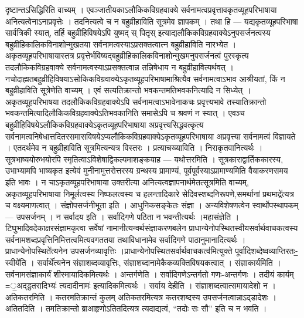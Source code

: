 दृष्टान्तऽसिद्धिरिति वाच्यम् । एवञ्जातीयकाऽलौकिकविग्रहवाक्ये
सर्वनामत्वप्रवृत्तावकृतव्यूहपरिभाषाया अनित्यत्वेनाऽनाप्रवृत्तेः ।
तदनित्यत्वे च न बहुव्रीहाविति सूत्रमेव ज्ञापकम् । तथा हि ---
यद्यकृतव्यूहपरिभाषा सार्वत्रिकी स्यात्, तर्हि बहुव्रीहिविषयेऽपि युष्मद्
स् पितृस् इत्याद्यलौकिकविग्रहवाक्येऽनुपसर्जनत्वस्य
बहुव्रीहिकालिकविनाशोन्मुखतया सर्वनामत्वस्याऽप्रसक्तत्वात्न
बहुव्रीहा॑विति नारभ्येत । अकृतव्यूहपरिभाषायास्तत्र
प्रवृत्तेर्भविष्यद्बहुव्रीहिकालिकविनाशोन्मुखमनुपसर्जनत्वं पुरस्कृत्य
तदलौकिकविग्रहवाक्ये सर्वनामत्वस्याऽप्रसक्तत्वान्न तन्निषेधाय न
बहुव्रीहावित्यर्थवत् ।
नचोदाह्मतबहुव्रीहिविषयाऽसोकिकविग्रवाक्येऽकृतव्यूहपरिभाषामाश्रित्यैव
सर्वनामत्वाऽभाव आश्रीयतां, किं न बहुव्रीहाविति सूत्रेणेति वाच्यम् । एवं
सत्यतिक्रान्तो भवकन्तमतिभवकनित्यादि न सिध्येत् । अकृतव्यूहपरिभाषया
तदलौकिकविग्रहवाक्येऽपि सर्वनामत्वाऽभावेनाकचः प्रवृत्त्यभावे
तस्यातिक्रान्तो भवकन्तमित्यादिलौकिकविग्रहवाक्येऽतिभवकानिति समासेऽपि च
श्रवणं न स्यात् । एवञ्च
बहुव्रीहिविषयेऽलौकिकविग्रहवाक्येऽकृतव्यूहपरिभाषाया
अप्रवृत्त्यसिद्धवत्कृत्य
सर्वनामत्वनिषेधात्तदितरसमासविषयेऽप्यलौकिकविग्रहवाक्येऽकृतव्यूहपरिभाषाया
अप्रवृत्त्या सर्वनामत्वं विज्ञायते । एतदर्थमेव न बहुव्रीहाविति
सूत्रमित्यन्यत्र विस्तरः । प्रत्याचख्याविति । निराकृतवानित्यर्थः ।
सूत्रभाष्ययोरुभयोरपि स्मृतित्वाऽविशेषाद्विकल्पमाशङ्कयाह --- यथोत्तरमिति
। सूत्रकाराद्वार्तिककारस्य, उभाभ्यामपि भाष्यकृत इत्येवं
मुनीनामुत्तरोत्तरस्य ग्रन्थस्य प्रामाण्यं, पूर्वपूर्वस्याऽप्रामाण्यमिति
वैयाकरणसमय इति भावः । न चाऽकृतव्यूहपरिभाषाया उक्तरीत्या
अनित्यत्वज्ञापनार्थमेतत्सूत्रमिति वाच्यम्, अकृतव्यूहपरिभाषाया
निमूर्लत्वस्य निष्फलत्वस्य च हलन्तादिकारे सेदिवस्शब्दनिरूपणे,समर्थानां
प्रथमाद्रे॑त्यत्र च वक्ष्यमाणत्वात् । संज्ञोपसर्जनीभूता इति ।
आधुनिकसङ्केतः संज्ञा । अन्यविशेषणत्वेन स्वार्थोपस्थापकम् --- उपसर्जनम् ।
न सर्वादय इति । सर्वादिगणे पठिता न भवन्तीत्यर्थः ।महासंज्ञेति ।
टिघुभादिवदेकाक्षरसंज्ञामकृत्वा सर्वेषां नामानीत्यन्वर्थसंज्ञाकरणबलेन
प्राधान्येनोपस्थितस्वीयसर्वार्थवाचकत्वस्य
सर्वनामशब्दप्रवृत्तिनिमित्तत्वमित्यवगततया तथाविधानामेव सर्वादिगणे
पाठानुमानादित्यर्थः ।प्राधान्येनोपस्थिते॑त्यनेन उपसर्जनव्यावृत्तिः
।प्राधान्येनोपस्थितसर्वार्थवाचकत्व॑मित्युक्ते
पूर्वादिशब्देष्वव्याप्तिरतः-॒स्वीये॑ति । सर्वार्थे॑त्यनेन
संज्ञाशब्दव्यावृत्तिः, संज्ञाशब्दानामेकैकव्यक्तिविषयकत्वात् ।
संज्ञाकार्यमिति । सर्वनामसंज्ञाकार्यं शीस्मायादिकमित्यर्थः । अन्तर्गणेति
। सर्वादिगणेऽन्तर्गतो गणः-अन्तर्गणः । तदीयं कार्यम् =॒अद्ड्डतरादिभ्यः॑
त्यदादीनामः॑ इत्यादिकमित्यर्थः । सर्वाय देहीति ।
संज्ञाशब्दत्वात्समायादेशो न । अतिकतरमिति । कतरमतिक्रान्तं कुलम्
अतिकतरमित्यत्र कतरशब्दस्य उपसर्जनत्वान्नाऽद्डादेशः । अतितदिति ।
तमतिक्रान्तो ब्राआहृणोऽतितदित्यत्र त्यदाद्यत्वं, ``तदोः सः सौ'' इति च न
भवति ।
